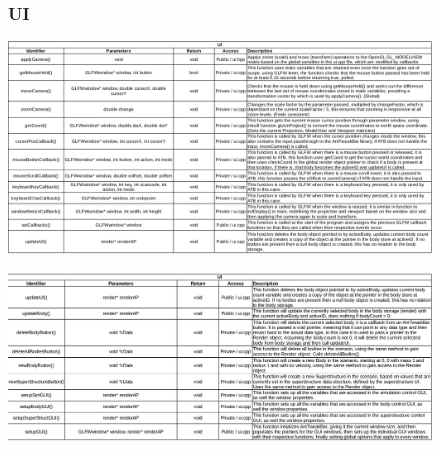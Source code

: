 \begin{figure}
  \subsubsection{UI}
  \centering  
  \includegraphics[width=\textwidth]{img/functions/ui.png}
\end{figure}

\begin{figure}
  \centering  
  \includegraphics[width=\textwidth]{img/functions/ui2.png}
\end{figure}

